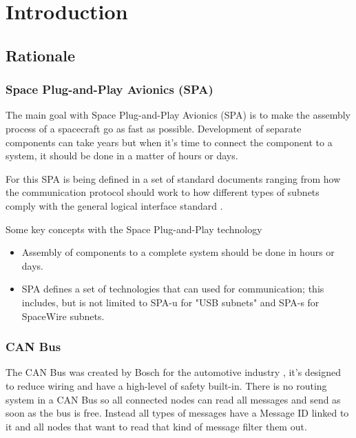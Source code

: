 \section{Introduction}
\subsection{Rationale}
\subsubsection{Space Plug-and-Play Avionics (SPA)}
The main goal with Space Plug-and-Play Avionics (SPA) is to make the
assembly process of a spacecraft go as fast as possible. Development of
separate components can take years but when it's time to connect the component
to a system, it should be done in a matter of hours or days.

For this SPA is being defined in a set of standard documents ranging from how
the communication protocol should work to how different types of subnets comply
with the general logical interface standard \cite{standard:spa_logical_interface,
    standard:spa_networking,standard:spa_spacewire_adaptation,standard:spa_physical_interface,
standard:spa_local_adaptation}.

Some key concepts with the Space Plug-and-Play technology
\begin{itemize}
    \item Assembly of components to a complete system should be done in hours or days.
    \item SPA defines a set of technologies that can used for communication;
        this includes, but is not limited to SPA-u for "USB subnets" and SPA-s
        for SpaceWire subnets.
\end{itemize}



\subsubsection{CAN Bus}
The CAN Bus was created by Bosch for the automotive industry \cite{standard:can_bus}, it's designed to
reduce wiring and have a high-level of safety built-in. There is no routing
system in a CAN Bus so all connected nodes can read all messages and send as
soon as the bus is free. Instead all types of messages have a Message ID linked
to it and all nodes that want to read that kind of message filter them out.

